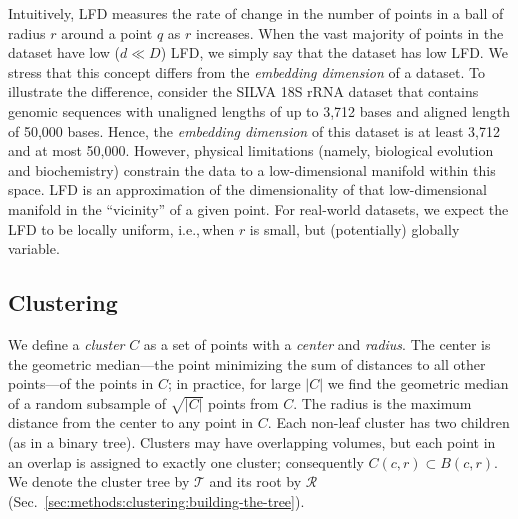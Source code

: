 
Intuitively, LFD measures the rate of change in the number of points in a ball of radius $r$ around a point $q$ as $r$ increases.
When the vast majority of points in the dataset have low ($d \ll D$) LFD, we simply say that the dataset has low LFD.
We stress that this concept differs from the \textit{embedding dimension} of a dataset.
To illustrate the difference, consider the SILVA 18S rRNA dataset that contains genomic sequences with unaligned lengths of up to 3,712 bases and aligned length of 50,000 bases.
Hence, the \textit{embedding dimension} of this dataset is at least 3,712 and at most 50,000.
However, physical limitations (namely, biological evolution and biochemistry) constrain the data to a low-dimensional manifold within this space.
LFD is an approximation of the dimensionality of that low-dimensional manifold in the ``vicinity'' of a given point.
For real-world datasets, we expect the LFD to be locally uniform, i.e.,\,when $r$ is small, but (potentially) globally variable.


\subsection{Clustering}
\label{sec:methods:clustering}

We define a \emph{cluster} $C$ as a set of points with a \emph{center} and \emph{radius}.
The center is the geometric median—the point minimizing the sum of distances to all other points—of the points in $C$;
in practice, for large $|C|$ we find the geometric median of a random subsample of $\sqrt{|C|}$ points from $C$.
The radius is the maximum distance from the center to any point in $C$.
Each non-leaf cluster has two children (as in a binary tree).
Clusters may have overlapping volumes, but each point in an overlap is assigned to exactly one cluster;
consequently $C(c,r)\subset B(c,r)$.
We denote the cluster tree by $\mathcal{T}$ and its root by $\mathcal{R}$ (Sec.~\ref{sec:methods:clustering:building-the-tree}).


